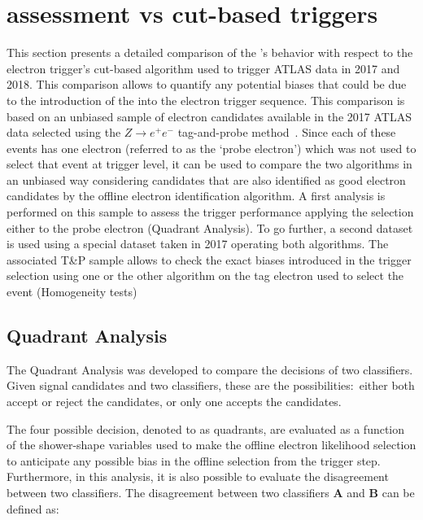 
\section{\rnn{} assessment vs cut-based triggers}%
\label{sec:off_ana}

This section presents a detailed comparison of the \rnn{}'s behavior with respect to the electron trigger's cut-based algorithm used to trigger ATLAS data in 2017 and 2018. This comparison allows to quantify any potential biases that could be due to the introduction of the \rnn into the electron trigger sequence. This comparison is based on an unbiased sample of electron candidates available in the 2017 ATLAS data selected using the $Z\rightarrow e^+e^-$ tag-and-probe method~\cite{TRIG-2018-05}. Since each of these events has one electron (referred to as the ‘probe electron’) which was not used to select that event at trigger level, it can be used to compare the two algorithms in an unbiased way considering candidates that are also identified as good electron candidates by the offline electron identification algorithm. A first analysis is performed on this sample to assess the trigger performance applying the \rnn{} selection either to the probe electron (Quadrant Analysis). To go further, a second dataset is used using a special dataset taken in 2017 operating both algorithms. The associated T&P sample allows to check the exact biases introduced in the trigger selection using one or the other algorithm on the tag electron used to select the event (Homogeneity tests)


\subsection{Quadrant Analysis}\label{ssec:quadrant}

The Quadrant Analysis was developed to compare the decisions of two classifiers. Given signal candidates and two classifiers, these are the possibilities:\ either both accept or reject the candidates, or only one accepts the candidates. 


The four possible decision, denoted to as quadrants, are evaluated as a function of the shower-shape variables used to make the offline electron likelihood selection to anticipate any possible bias in the offline selection from the trigger step. Furthermore, in this analysis, it is also possible to evaluate the disagreement between two classifiers. The disagreement between two classifiers $\textbf{A}$ and $\textbf{B}$ can be defined as:

